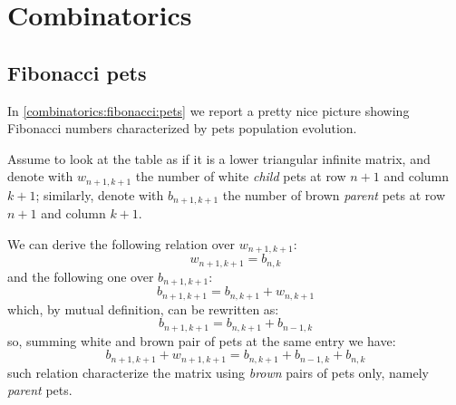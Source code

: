 
\chapter{Combinatorics}

\section{Fibonacci pets}

In \autoref{combinatorics:fibonacci:pets} we report a pretty nice 
picture showing Fibonacci numbers characterized by pets population
evolution.

Assume to look at the table as if it is a lower triangular infinite
matrix, and denote with $w_{n+1,k+1}$ the number of white \emph{child}
pets at row $n+1$ and column $k+1$; similarly, denote with 
$b_{n+1,k+1}$ the number of brown \emph{parent} pets at row $n+1$ and column $k+1$.

We can derive the following relation over $w_{n+1,k+1}$:
\begin{displaymath}
    w_{n+1,k+1} = b_{n,k}
\end{displaymath}
and the following one over $b_{n+1,k+1}$:
\begin{displaymath}
    b_{n+1,k+1} = b_{n,k+1} + w_{n,k+1}
\end{displaymath}
which, by mutual definition, can be rewritten as:
\begin{displaymath}
    b_{n+1,k+1} = b_{n,k+1} + b_{n-1,k}
\end{displaymath}
so, summing white and brown pair of pets at the same entry we have:
\begin{displaymath}
    b_{n+1,k+1}+w_{n+1,k+1} = b_{n,k+1} + b_{n-1,k} + b_{n,k}
\end{displaymath}
such relation characterize the matrix using \emph{brown} pairs of pets only,
namely \emph{parent} pets.


